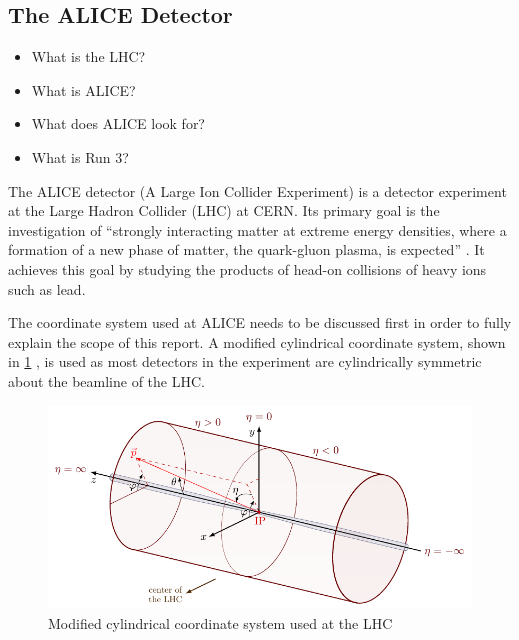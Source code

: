 \subsection{The ALICE Detector}
\begin{itemize}
    \item What is the LHC?
    \item What is ALICE?
    \item What does ALICE look for?
    \item What is Run 3?
\end{itemize}
The ALICE detector (A Large Ion Collider Experiment) is a detector experiment at the Large Hadron Collider (LHC) at CERN. Its primary goal is the investigation of ``strongly interacting matter at extreme energy densities, where a formation of a new phase of matter, the quark-gluon plasma, is expected'' \cite{ALICE_LOI}. It achieves this goal by studying the products of head-on collisions of heavy ions such as lead. 



The coordinate system used at ALICE needs to be discussed first in order to fully explain the scope of this report. A modified cylindrical coordinate system, shown in \cref{fig:coords} \cite{coords}, is used as most detectors in the experiment are cylindrically symmetric about the beamline of the LHC. 

\begin{figure}[h]
    \begin{center}
        \includegraphics[width=.8\textwidth]{Figs/coords.pdf}
        \caption{Modified cylindrical coordinate system used at the LHC \cite{coords}}
        \label{fig:coords}
    \end{center}
\end{figure}

